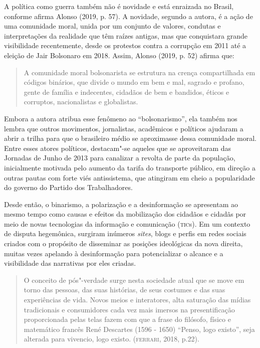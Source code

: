 A política como guerra também não é novidade e está enraizada no Brasil,
conforme afirma Alonso (2019, p. 57). A novidade, segundo a autora, é a
ação de uma comunidade moral, unida por um conjunto de valores, condutas
e interpretações da realidade que têm raízes antigas, mas que
conquistara grande visibilidade recentemente, desde os protestos contra
a corrupção em 2011 até a eleição de Jair Bolsonaro em 2018. Assim,
Alonso (2019, p. 52) afirma que:

\begin{quote}
A comunidade moral bolsonarista se estrutura na crença compartilhada em
códigos binários, que divide o mundo em bem e mal, sagrado e profano,
gente de família e indecentes, cidadãos de bem e bandidos, éticos e
corruptos, nacionalistas e globalistas.
\end{quote}

Embora a autora atribua esse fenômeno ao ``bolsonarismo'', ela também
nos lembra que outros movimentos, jornalistas, acadêmicos e políticos
ajudaram a abrir a trilha para que o brasileiro médio se aproximasse
dessa comunidade moral. Entre esses atores políticos, destacam"-se
aqueles que se aproveitaram das Jornadas de Junho de 2013 para canalizar
a revolta de parte da população, inicialmente motivada pelo aumento da
tarifa do transporte público, em direção a outras pautas com forte viés
antissistema, que atingiram em cheio a popularidade do governo do
Partido dos Trabalhadores.

Desde então, o binarismo, a polarização e a desinformação se apresentam
ao mesmo tempo como causas e efeitos da mobilização dos cidadãos e
cidadãs por meio de novas tecnologias da informação e comunicação
(\textsc{tic}s). Em um contexto de disputa hegemônica, surgiram inúmeros
\emph{sites}, blogs e perfis em redes sociais criados com o propósito de
disseminar as posições ideológicas da nova direita, muitas vezes
apelando à desinformação para potencializar o alcance e a visibilidade
das narrativas por eles criadas.

\begin{quote}
O conceito de pós"-verdade surge nesta sociedade atual que se move em
torno das pessoas, das suas histórias, de seus costumes e das suas
experiências de vida. Novos meios e interatores, alta saturação das
mídias tradicionais e consumidores cada vez mais imersos na
presentificação proporcionada pelas telas fazem com que a frase do
filósofo, físico e matemático francês René Descartes (1596 - 1650)
``Penso, logo existo'', seja alterada para vivencio, logo existo.
(\textsc{ferrari}, 2018, p.22).
\end{quote}

